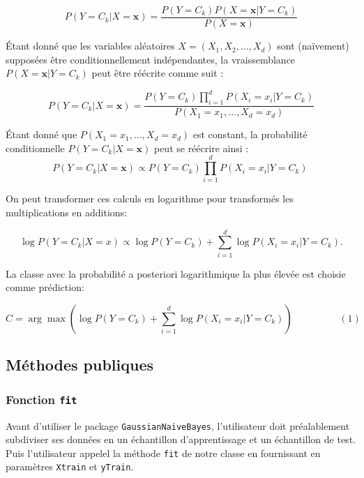 \documentclass[]{article}
\begin{document}
\[
P(Y = C_{k} | X = \mathbf{x}) = \frac{P(Y = C_{k}) P(X = \mathbf{x} | Y = C_{k})}{P(X = \mathbf{x})}
\]
\vspace{0.4\baselineskip}

Étant donné que les variables aléatoires \(X = (X_1, X_2, \ldots, X_d)\) sont (naïvement) supposées être conditionnellement indépendantes, la vraissemblance \(P(X = \mathbf{x} | Y = C_k)\) peut être réécrite comme suit :

\[
P(Y = C_k | X = \mathbf{x}) = \frac{P(Y = C_k) \prod_{i=1}^{d} P(X_i = x_i | Y = C_k)}{P(X_1 = x_1, \ldots, X_d = x_d)}
\]
\vspace{0.4\baselineskip}

Étant donné que \(P(X_1 = x_1, \ldots, X_d = x_d)\) est constant, la probabilité conditionnelle \(P(Y = C_k | X = \mathbf{x})\) peut se réécrire ainsi : 
\vspace{0.4\baselineskip}
\[
P(Y=C_k|X=\mathbf{x}) \propto P(Y=C_k)\prod_{i=1}^{d} P(X_i = x_i | Y = C_k)\
\]

On peut transformer ces calculs en logarithme pour transformés les multiplications en additions: 

\[
\log P(Y=C_k|X=x) \propto \log P(Y=C_k) + \sum_{i=1}^{d} \log P(X_i = x_i | Y = C_k).
\]

La classe avec la probabilité a posteriori logarithmique la plus élevée est choisie comme prédiction: 

\[
\hat{C} = \arg\max \left( \log P(Y=C_k) + \sum_{i=1}^{d} \log P(X_i = x_i | Y=C_k) \right) \hspace{2cm} (1)
\]

\newpage

\subsection{Méthodes publiques}
\subsubsection{Fonction \texttt{fit}} 
Avant d'utiliser le package \texttt{GaussianNaiveBayes}, l'utilisateur doit préalablement subdiviser ses données en un échantillon d'apprentissage et un échantillon de test. Puis l'utilisateur appelel la méthode \texttt{fit} de notre classe en fournissant en paramètres \texttt{Xtrain} et \texttt{yTrain}.
\end{document}
